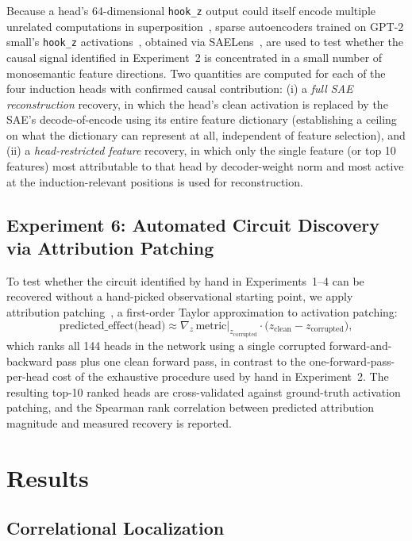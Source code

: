 \documentclass[conference]{IEEEtran}
\begin{document}
Because a head's 64-dimensional \texttt{hook\_z} output could itself encode multiple unrelated computations in superposition~\cite{bricken2023}, sparse autoencoders trained on GPT-2 small's \texttt{hook\_z} activations~\cite{kissane2024}, obtained via SAELens~\cite{bloom2024}, are used to test whether the causal signal identified in Experiment~2 is concentrated in a small number of monosemantic feature directions. Two quantities are computed for each of the four induction heads with confirmed causal contribution: (i) a \emph{full SAE reconstruction} recovery, in which the head's clean activation is replaced by the SAE's decode-of-encode using its entire feature dictionary (establishing a ceiling on what the dictionary can represent at all, independent of feature selection), and (ii) a \emph{head-restricted feature} recovery, in which only the single feature (or top 10 features) most attributable to that head by decoder-weight norm and most active at the induction-relevant positions is used for reconstruction.

\subsection{Experiment 6: Automated Circuit Discovery via Attribution Patching}

To test whether the circuit identified by hand in Experiments~1--4 can be recovered without a hand-picked observational starting point, we apply attribution patching~\cite{nanda2023attrpatch}, a first-order Taylor approximation to activation patching:
$$
\text{predicted\_effect(head)} \approx \nabla_{z}\,\text{metric}\big|_{z_{\text{corrupted}}} \cdot \big(z_{\text{clean}} - z_{\text{corrupted}}\big),
$$
which ranks all 144 heads in the network using a single corrupted forward-and-backward pass plus one clean forward pass, in contrast to the one-forward-pass-per-head cost of the exhaustive procedure used by hand in Experiment~2. The resulting top-10 ranked heads are cross-validated against ground-truth activation patching, and the Spearman rank correlation between predicted attribution magnitude and measured recovery is reported.

\section{Results}
\label{sec:results}

\subsection{Correlational Localization}
\end{document}
